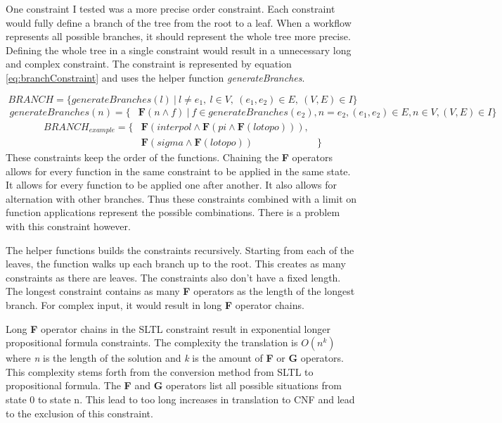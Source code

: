 \documentclass{article}
\begin{document}
One constraint I tested was a more precise order constraint. Each constraint would fully define a branch of the tree from the root to a leaf. When a workflow represents all possible branches, it should represent the whole tree more precise. Defining the whole tree in a single constraint would result in a unnecessary long and complex constraint. The constraint is represented by equation \ref{eq:branchConstraint} and uses the helper function \textit{generateBranches}.

\begin{equation}
    BRANCH = \{ generateBranches(l)\ |\ l \not = e_1,\ l \in V,\ (e_1, e_2) \in E,\  (V,E) \in  I \} \label{eq:branchConstraint}
\end{equation}
\begin{align*}
    generateBranches(n) = \{
    &\textbf{F}(n \wedge f)\ |\ f \in generateBranches(e_2) , n = e_2 ,(e_1,e_2) \in E, n \in V  ,(V,E) \in I \}
\end{align*}
\begin{align*}
    BRANCH_{example}=\{& \textbf{F}(interpol \wedge \textbf{F}(pi \wedge \textbf{F}(lotopo))), \\
    &\textbf{F}(sigma \wedge \textbf{F}(lotopo))  &  \}
\end{align*}
% 
These constraints keep the order of the functions. Chaining the \textbf{F} operators allows for every function in the same constraint to be applied in the same state. It allows for every function to be applied one after another. It also allows for alternation with other branches. Thus these constraints combined with a limit on function applications represent the possible combinations. There is a problem with this constraint however.

The helper functions builds the constraints recursively. Starting from each of the leaves, the function walks up each branch up to the root. This creates as many constraints as there are leaves. The constraints also don't have a fixed length. The longest constraint contains as many \textbf{F} operators as the length of the longest branch. For complex input, it would result in long \textbf{F} operator chains. 

Long \textbf{F} operator chains in the SLTL constraint result in exponential longer propositional formula constraints. The complexity the translation is $O(n^k)$ where \textit{n} is the length of the solution and \textit{k} is the amount of \textbf{F} or \textbf{G} operators. This complexity stems forth from the conversion method from SLTL to propositional formula. The \textbf{F} and \textbf{G} operators list all possible situations from state 0 to state n. This lead to too long increases in translation to CNF and lead to the exclusion of this constraint. 
\\
\end{document}
